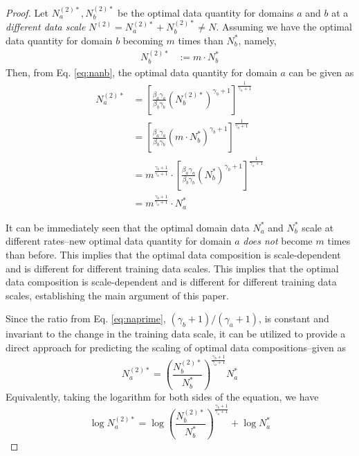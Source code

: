 \documentclass{article} %
\begin{document}
\begin{appendices}{}
\begin{proof}
Let $N_a^{(2)*},N_b^{(2)*}$ be the optimal data quantity for domains $a$ and $b$ at a \textit{different data scale} $N^{(2)}=N_a^{(2)*}+N_b^{(2)*}\neq N$. Assuming we have the optimal data quantity for domain $b$ becoming $m$ times than $N_b^*$, namely, 
\begin{equation*}
\begin{aligned}
N_b^{(2)*}&:=m\cdot N_b^*
\end{aligned}
\end{equation*}
Then, from Eq. \ref{eq:nanb}, the optimal data quantity for domain $a$ can be given as
\begin{equation}\label{eq:naprime}
\begin{aligned}
N_a^{(2)*}&=\left[\frac{\beta_a\gamma_a}{\beta_b\gamma_b}(N_b^{(2)*})^{\gamma_b+1}\right]^{\frac{1}{\gamma_a+1}} \\
&=\left[\frac{\beta_a\gamma_a}{\beta_b\gamma_b}(m\cdot N_b^*)^{\gamma_b+1}\right]^{\frac{1}{\gamma_a+1}} \\
&=m^{\frac{\gamma_b+1}{\gamma_a+1}}\cdot\left[\frac{\beta_a\gamma_a}{\beta_b\gamma_b}(N_b^*)^{\gamma_b+1}\right]^{\frac{1}{\gamma_a+1}} \\
&= m^{\frac{\gamma_b+1}{\gamma_a+1}}\cdot N_a^* %
\end{aligned}
\end{equation}


It can be immediately seen that the optimal domain data $N_a^*$ and $N_b^*$ scale at different rates–new optimal data quantity for domain $a$ \textit{does not} become $m$ times than before. 
This implies that the optimal data composition is scale-dependent and is different for different training data scales. 
This implies that the optimal data composition is scale-dependent and is different for different training data scales, establishing the main argument of this paper.

Since the ratio from Eq. \ref{eq:naprime}, $(\gamma_b+1)/(\gamma_a+1)$, is constant and invariant to the change in the training data scale, it can be utilized to provide a direct approach for predicting the scaling of optimal data compositions–given as
\begin{equation*}
    N_a^{(2)*} = (\frac{N_b^{(2)*}}{N_b^*})^{{\frac{\gamma_b+1}{\gamma_a+1}}}N_a^*
\end{equation*}
Equivalently, taking the logarithm for both sides of the equation, we have
\begin{equation*}
    \log N_a^{(2)*} = \log(\frac{N_b^{(2)*}}{N_b^*})^{{\frac{\gamma_b+1}{\gamma_a+1}}} + \log  N_a^*
\end{equation*}


\end{proof}
\end{appendices}
\end{document}
